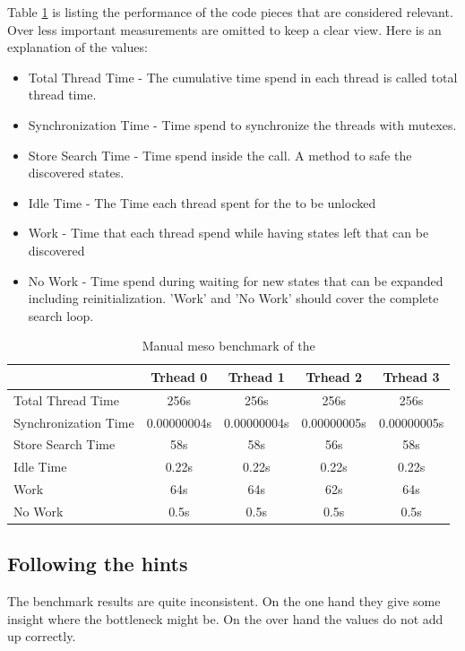 Table \ref{ManualBenchmark} is listing the performance of the code pieces that are considered relevant. Over less important measurements are omitted to keep a clear view. Here is an explanation of the values:
\begin{itemize}
    \item Total Thread Time - The cumulative time spend in each thread is called total thread time.
    \item Synchronization Time - Time spend to synchronize the threads with mutexes.
    \item Store Search Time - Time spend inside the  call. A method to safe the discovered states.
    \item Idle Time - The Time each thread spent for the  to be unlocked
    \item Work - Time that each thread spend while having states left that can be discovered
    \item No Work - Time spend during waiting for new states that can be expanded including reinitialization. 'Work' and  'No Work' should cover the complete search loop.
\end{itemize}

\begin{center}
    \begin{table}[H]
        \centering
        \begin{tabular}{ | l | c | c | c | c |}
            \hline
            \textbf{} & \textbf{Trhead 0} & \textbf{Trhead 1} & \textbf{Trhead 2} & \textbf{Trhead 3}\\ \hline
            Total Thread Time & 256s & 256s & 256s & 256s \\ 
            Synchronization Time & 0.00000004s & 0.00000004s & 0.00000005s & 0.00000005s \\
            Store Search Time & 58s & 58s & 56s & 58s \\ 
            Idle Time & 0.22s & 0.22s & 0.22s & 0.22s \\ 
            Work & 64s & 64s & 62s & 64s \\ 
            No Work & 0.5s & 0.5s & 0.5s & 0.5s \\ \hline
        \end{tabular}
        \caption{Manual meso benchmark of the }
        \label{ManualBenchmark}
    \end{table}
\end{center}

\subsection{Following the hints}
The benchmark results are quite inconsistent. On the one hand they give some insight where the bottleneck might be. On the over hand the values do not add up correctly.

